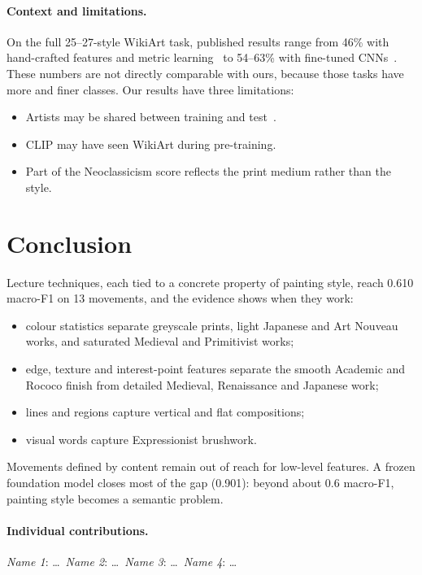 \documentclass[10pt,twocolumn,a4paper]{article}
\begin{document}
\paragraph{Context and limitations.}
On the full 25--27-style WikiArt task, published results range from 46\% with hand-crafted features and metric learning~\cite{saleh2016large} to 54--63\% with fine-tuned CNNs~\cite{tan2016ceci,lecoutre2017recognizing}. These numbers are not directly comparable with ours, because those tasks have more and finer classes. Our results have three limitations:
\begin{itemize}
\item Artists may be shared between training and test~\cite{ashton2026style}.
\item CLIP may have seen WikiArt during pre-training.
\item Part of the Neoclassicism score reflects the print medium rather than the style.
\end{itemize}

\section{Conclusion}
Lecture techniques, each tied to a concrete property of painting style, reach 0.610 macro-F1 on 13 movements, and the evidence shows when they work:
\begin{itemize}
\item colour statistics separate greyscale prints, light Japanese and Art Nouveau works, and saturated Medieval and Primitivist works;
\item edge, texture and interest-point features separate the smooth Academic and Rococo finish from detailed Medieval, Renaissance and Japanese work;
\item lines and regions capture vertical and flat compositions;
\item visual words capture Expressionist brushwork.
\end{itemize}
Movements defined by content remain out of reach for low-level features. A frozen foundation model closes most of the gap (0.901): beyond about 0.6 macro-F1, painting style becomes a semantic problem.

\paragraph{Individual contributions.}
\emph{Name 1}: \dots\ \emph{Name 2}: \dots\ \emph{Name 3}: \dots\ \emph{Name 4}: \dots

{\small


}
\end{document}
